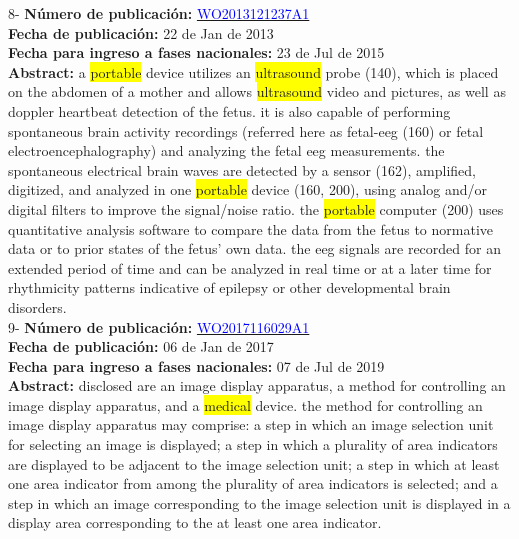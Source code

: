  \vspace{1cm}8- \textbf{Número de publicación:} \href{https://worldwide.espacenet.com/publicationDetails/biblio?DB=EPODOC&II=0&ND=3&adjacent=true&locale=en_EP&FT=D&date=20160331&CC=WO&NR=2013121237A1&KC=A1#}{\textcolor{blue}{WO2013121237A1}}\\ 
\textbf{Fecha de publicación:} 22 de Jan de 2013\\ 
\textbf{Fecha para ingreso a fases nacionales:} 23 de Jul de 2015\\ 
\textbf{Abstract:} a \colorbox{yellow}{\colorbox{yellow}{portable}} device utilizes an \colorbox{yellow}{ultrasound} probe (140), which is placed on the abdomen of a mother and allows \colorbox{yellow}{ultrasound} video and pictures, as well as doppler heartbeat detection of the fetus. it is also capable of performing spontaneous brain activity recordings (referred here as fetal-eeg (160) or fetal electroencephalography) and analyzing the fetal eeg measurements. the spontaneous electrical brain waves are detected by a sensor (162), amplified, digitized, and analyzed in one \colorbox{yellow}{\colorbox{yellow}{portable}} device (160, 200), using analog and/or digital filters to improve the signal/noise ratio. the \colorbox{yellow}{\colorbox{yellow}{portable}} computer (200) uses quantitative analysis software to compare the data from the fetus to normative data or to prior states of the fetus' own data. the eeg signals are recorded for an extended period of time and can be analyzed in real time or at a later time for rhythmicity patterns indicative of epilepsy or other developmental brain disorders.\\ 
 

 \vspace{1cm}9- \textbf{Número de publicación:} \href{https://worldwide.espacenet.com/publicationDetails/biblio?DB=EPODOC&II=0&ND=3&adjacent=true&locale=en_EP&FT=D&date=20160331&CC=WO&NR=2017116029A1&KC=A1#}{\textcolor{blue}{WO2017116029A1}}\\ 
\textbf{Fecha de publicación:} 06 de Jan de 2017\\ 
\textbf{Fecha para ingreso a fases nacionales:} 07 de Jul de 2019\\ 
\textbf{Abstract:} disclosed are an image display apparatus, a method for controlling an image display apparatus, and a \colorbox{yellow}{medical} device. the method for controlling an image display apparatus may comprise: a step in which an image selection unit for selecting an image is displayed; a step in which a plurality of area indicators are displayed to be adjacent to the image selection unit; a step in which at least one area indicator from among the plurality of area indicators is selected; and a step in which an image corresponding to the image selection unit is displayed in a display area corresponding to the at least one area indicator.\\ 
 

